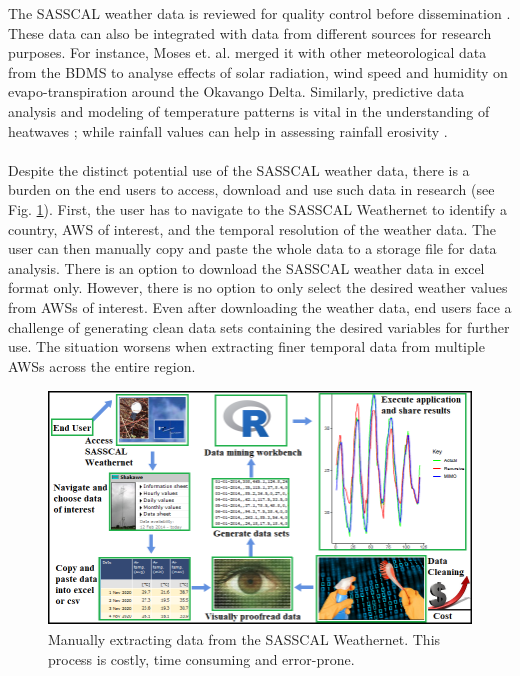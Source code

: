 \documentclass[a4paper, 10pt, conference]{ieeeconf}      %
\begin{document}
\newpage
\noindent
	The SASSCAL weather  data is  reviewed for quality control   before dissemination  \cite{kaspar2015sasscal}. These data can also be integrated with
data from different sources for research purposes. For
instance, Moses et. al. \cite{moses2018effects} merged it  with
other meteorological data from the BDMS to analyse effects of solar radiation,
wind speed and humidity on evapo-transpiration around
the Okavango Delta. Similarly, predictive data analysis and modeling of   temperature
patterns   \cite{thapelo2019machine,thapelo2014tecnicas} is vital in the understanding of heatwaves \cite{moses2017heat}; while
rainfall values can help in assessing rainfall erosivity \cite{singh2020assessing}.
\\
\\
\noindent
Despite the distinct potential use of the SASSCAL weather data, there is a burden on the end users to access, download and use such data in research (see Fig. \ref{datamunging}). %
	First, the user has to navigate to the SASSCAL Weathernet to identify a country,   AWS  of interest, and the temporal resolution of the   weather data. %
The user can then manually copy and paste the whole data to a storage file for data analysis. There is an option to download the SASSCAL weather data in excel format only. %
	However, there is no option to only select the desired weather values from AWSs of interest. Even after downloading the weather data, end users face a challenge of generating clean data sets containing the desired variables for further use. 
   	    The situation worsens when extracting finer  temporal data   from multiple AWSs across the  entire region. 
	\begin{figure}[h]
   		\centering
   		\includegraphics[width=0.98\linewidth]{fig/MiPipe}
   		\caption{Manually extracting data  from the  SASSCAL Weathernet. This process is costly, time consuming and error-prone. }
   		\label{datamunging}
   	\end{figure}
   	
\end{document}
